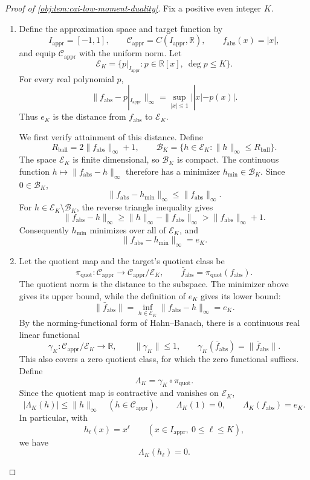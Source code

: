 \documentclass[11pt]{article}
\begin{document}
\begin{proof}[Proof of \cref{obj:lem:cai-low-moment-duality}]
Fix a positive even integer \(K\).

\begin{enumerate}
\item Define the approximation space and target function by
\[
I_{\mathrm{appr}}=[-1,1],\qquad
\mathcal C_{\mathrm{appr}}=C(I_{\mathrm{appr}},\mathbb R),\qquad
f_{\mathrm{abs}}(x)=|x|,
\]
and equip \(\mathcal C_{\mathrm{appr}}\) with the uniform norm. Let
\[
\mathcal E_K
=\{p|_{I_{\mathrm{appr}}}:p\in\mathbb R[x],\ \deg p\le K\}.
\]
For every real polynomial \(p\),
\[
\|f_{\mathrm{abs}}-p|_{I_{\mathrm{appr}}}\|_\infty
=\sup_{|x|\le1}\bigl||x|-p(x)\bigr|.
\]
Thus \(e_K\) is the distance from \(f_{\mathrm{abs}}\) to \(\mathcal E_K\).

We first verify attainment of this distance. Define
\[
R_{\mathrm{ball}}=2\|f_{\mathrm{abs}}\|_\infty+1,\qquad
\mathcal B_K
=\{h\in\mathcal E_K:\|h\|_\infty\le R_{\mathrm{ball}}\}.
\]
The space \(\mathcal E_K\) is finite dimensional, so \(\mathcal B_K\) is compact. The continuous function
\(h\mapsto\|f_{\mathrm{abs}}-h\|_\infty\) therefore has a minimizer
\(h_{\mathrm{min}}\in\mathcal B_K\). Since \(0\in\mathcal B_K\),
\[
\|f_{\mathrm{abs}}-h_{\mathrm{min}}\|_\infty
\le\|f_{\mathrm{abs}}\|_\infty.
\]
For \(h\in\mathcal E_K\setminus\mathcal B_K\), the reverse triangle inequality gives
\[
\|f_{\mathrm{abs}}-h\|_\infty
\ge\|h\|_\infty-\|f_{\mathrm{abs}}\|_\infty
>\|f_{\mathrm{abs}}\|_\infty+1.
\]
Consequently \(h_{\mathrm{min}}\) minimizes over all of \(\mathcal E_K\), and
\[
\|f_{\mathrm{abs}}-h_{\mathrm{min}}\|_\infty=e_K.
\]

\item Let the quotient map and the target's quotient class be
\[
\pi_{\mathrm{quot}}:\mathcal C_{\mathrm{appr}}
\longrightarrow\mathcal C_{\mathrm{appr}}/\mathcal E_K,
\qquad
\bar f_{\mathrm{abs}}=\pi_{\mathrm{quot}}(f_{\mathrm{abs}}).
\]
The quotient norm is the distance to the subspace. The minimizer above gives its upper bound, while the definition of \(e_K\) gives its lower bound:
\[
\|\bar f_{\mathrm{abs}}\|
=\inf_{h\in\mathcal E_K}\|f_{\mathrm{abs}}-h\|_\infty
=e_K.
\]
By the norming-functional form of Hahn--Banach, there is a continuous real linear functional
\[
\gamma_K:\mathcal C_{\mathrm{appr}}/\mathcal E_K\longrightarrow\mathbb R,
\qquad
\|\gamma_K\|\le1,\qquad
\gamma_K(\bar f_{\mathrm{abs}})=\|\bar f_{\mathrm{abs}}\|.
\]
This also covers a zero quotient class, for which the zero functional suffices. Define
\[
\Lambda_K=\gamma_K\circ\pi_{\mathrm{quot}}.
\]
Since the quotient map is contractive and vanishes on \(\mathcal E_K\),
\[
|\Lambda_K(h)|\le\|h\|_\infty
\quad(h\in\mathcal C_{\mathrm{appr}}),\qquad
\Lambda_K(1)=0,\qquad
\Lambda_K(f_{\mathrm{abs}})=e_K.
\]
In particular, with
\[
h_\ell(x)=x^\ell
\qquad(x\in I_{\mathrm{appr}},\ 0\le\ell\le K),
\]
we have
\[
\Lambda_K(h_\ell)=0.
\]


\end{enumerate}
\end{proof}
\end{document}
